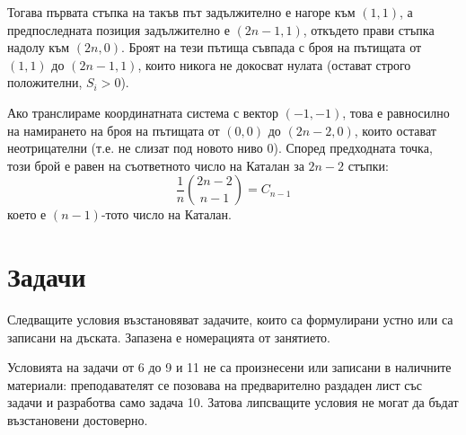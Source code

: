 Тогава първата стъпка на такъв път задължително е нагоре към $(1,1)$, а предпоследната позиция задължително е $(2n-1, 1)$, откъдето прави стъпка надолу към $(2n,0)$.
Броят на тези пътища съвпада с броя на пътищата от $(1,1)$ до $(2n-1, 1)$, които никога не докосват нулата (остават строго положителни, $S_i > 0$).

Ако транслираме координатната система с вектор $(-1,-1)$, това е равносилно на намирането на броя на пътищата от $(0,0)$ до $(2n-2, 0)$, които остават неотрицателни (т.е. не слизат под новото ниво 0).
Според предходната точка, този брой е равен на съответното число на Каталан за $2n-2$ стъпки:
\[ \frac{1}{n} \binom{2n-2}{n-1} = C_{n-1} \]
което е $(n-1)$-тото число на Каталан.

\section{Задачи}

Следващите условия възстановяват задачите, които са формулирани устно или са записани на дъската. Запазена е номерацията от занятието.

Условията на задачи от 6 до 9 и 11 не са произнесени или записани в наличните материали: преподавателят се позовава на предварително раздаден лист със задачи и разработва само задача 10. Затова липсващите условия не могат да бъдат възстановени достоверно.

